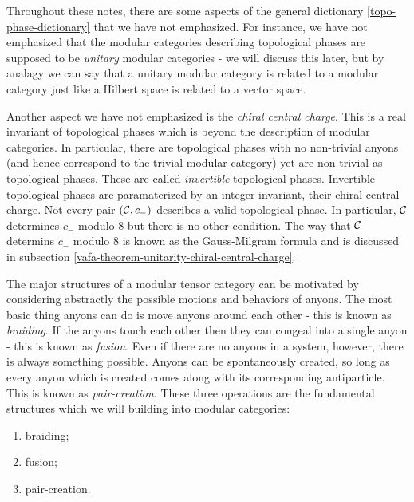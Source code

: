 \begin{rem} Throughout these notes, there are some aspects of the general dictionary \ref{topo-phase-dictionary} that we have not emphasized. For instance, we have not emphasized that the modular categories describing topological phases are supposed to be {\em unitary} modular categories - we will discuss this later, but by analagy we can say that a unitary modular category is related to a modular category just like a Hilbert space is related to a vector space.

Another aspect we have not emphasized is the {\em chiral central charge}. This is a real invariant of topological phases which is beyond the description of modular categories. In particular, there are topological phases with no non-trivial anyons (and hence correspond to the trivial modular category) yet are non-trivial as topological phases. These are called {\em invertible} topological phases. Invertible topological phases are paramaterized by an integer invariant, their chiral central charge. Not every pair $({\mathcal C},c_-)$ describes a valid topological phase. In particular, ${\mathcal C}$ determines $c_-$ modulo $8$ but there is no other condition. The way that ${\mathcal C}$ determins $c_-$ modulo $8$ is known as the Gauss-Milgram formula and is discussed in subsection \ref{vafa-theorem-unitarity-chiral-central-charge}. 
\end{rem}

\begin{rem}
The major structures of a modular tensor category can be motivated by considering abstractly the possible motions and behaviors of anyons. The most basic thing anyons can do is move anyons around each other - this is known as {\em braiding}. If the anyons touch each other then they can congeal into a single  anyon - this is known as {\em fusion}. Even if there are no anyons in a system, however, there is always something possible. Anyons can be spontaneously created, so long as every anyon which is created comes along with its corresponding antiparticle. This is known as {\em pair-creation}. These three operations are the fundamental structures which we will building into modular categories:

\begin{enumerate}
\item braiding;
\item fusion;
\item pair-creation.
\end{enumerate}
\end{rem}

